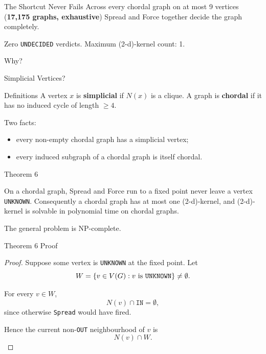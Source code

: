 \documentclass[11pt]{beamer}
\begin{document}
\begin{frame}{The Shortcut Never Fails}
  Across every chordal graph on at most 9 vertices (\textbf{17{,}175 graphs,
    exhaustive}) Spread and Force together decide the graph
  completely.

  \bigskip
  Zero \texttt{UNDECIDED} verdicts. Maximum (2-d)-kernel count: 1.

  \bigskip
  Why?
\end{frame}

\begin{frame}{Simplicial Vertices?}
  \begin{block}{Definitions}
    A vertex $x$ is \textbf{simplicial} if $N(x)$ is a clique. A graph is
    \textbf{chordal} if it has no induced cycle of length $\ge 4$.
  \end{block}

  \bigskip
  Two facts:
  \begin{itemize}
    \item every non-empty chordal graph has a simplicial vertex;
    \item every induced subgraph of a chordal graph is itself chordal.
  \end{itemize}
\end{frame}

\begin{frame}{Theorem 6}
  \begin{theorem}
    On a chordal graph, Spread and Force run to a fixed point never leave a
    vertex \texttt{UNKNOWN}. Consequently a chordal graph has at most one
    (2-d)-kernel, and (2-d)-kernel is solvable in polynomial time on chordal graphs.
  \end{theorem}

  \bigskip
  The general problem is NP-complete.
\end{frame}

\begin{frame}{Theorem 6 Proof}
  \begin{proof}
    Suppose some vertex is \texttt{UNKNOWN} at the fixed point.
    Let
    \[
      W=\{v\in V(G):v\text{ is \texttt{UNKNOWN}}\}\neq\emptyset.
    \]

    \smallskip
    For every $v\in W$,
    \[
      N(v)\cap\texttt{IN}=\emptyset,
    \]
    since otherwise \texttt{Spread} would have fired.

    Hence the current non-\texttt{OUT} neighbourhood of $v$ is
    \[
      N(v)\cap W.
    \]
  \end{proof}
\end{frame}
\end{document}
